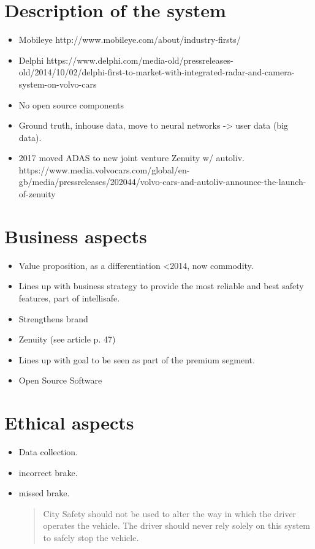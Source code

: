 \documentclass[conference]{IEEEtran}
\begin{document}
\section{Description of the system}
\begin{itemize}
	\item Mobileye http://www.mobileye.com/about/industry-firsts/
	\item Delphi https://www.delphi.com/media-old/pressreleases-old/2014/10/02/delphi-first-to-market-with-integrated-radar-and-camera-system-on-volvo-cars
	\item No open source components
	\item Ground truth, inhouse data, move to neural networks -> user data (big data).
	\item 2017 moved ADAS to new joint venture Zenuity w/ autoliv. https://www.media.volvocars.com/global/en-gb/media/pressreleases/202044/volvo-cars-and-autoliv-announce-the-launch-of-zenuity
\end{itemize}

\section{Business aspects}
\begin{itemize}
	\item Value proposition, as a differentiation <2014, now commodity.
	\item Lines up with business strategy to provide the most reliable and best safety features, part of intellisafe.
	\item Strengthens brand
	\item Zenuity (see article p. 47)
	\item Lines up with goal to be seen as part of the premium segment.
	\item Open Source Software
\end{itemize}
\section{Ethical aspects}
\begin{itemize}
	\item Data collection.
	\item incorrect brake.
	\item missed brake.
	\begin{quotation}
		City Safety should not be used to alter the way in which the driver operates the vehicle. The driver should never rely solely on this system to safely stop the vehicle.
	\end{quotation}
\end{itemize}
\end{document}
